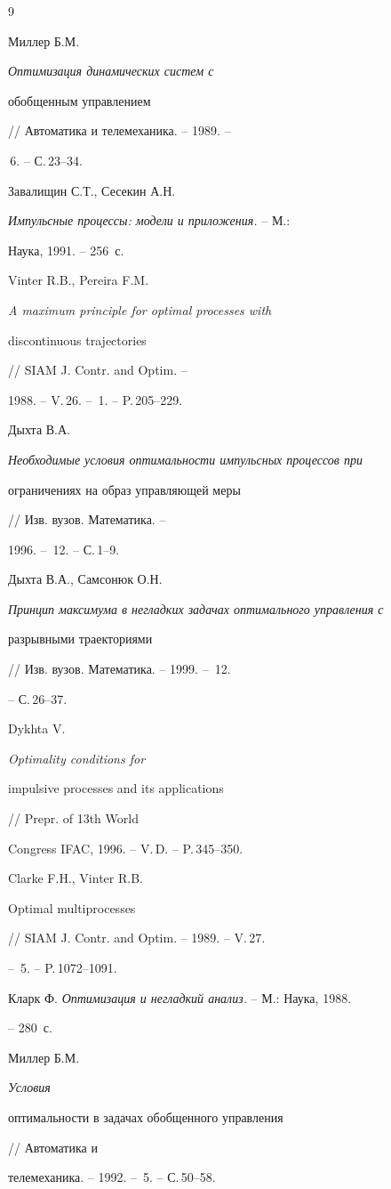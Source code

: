 \begin{thebibliography}{9}




Миллер Б.М. {\it Оптимизация динамических систем с


обобщенным управлением} // Автоматика и телемеханика. -- 1989. --


\No\,6. -- С.\,23--34.




Завалищин С.Т., Сесекин А.Н.


{\it Импульсные процессы: модели и приложения.} -- М.:


Наука, 1991. -- 256~с.




Vinter R.B., Pereira F.M.


{\it A maximum principle for optimal processes with


discontinuous trajectories} // SIAM J. Contr. and Optim. --


1988. -- V.\,26. -- \No\,1. -- P.\,205--229.




Дыхта В.А.


{\it Необходимые условия оптимальности импульсных процессов при


ограничениях на образ управляющей меры} // Изв. вузов. Математика. --


1996. -- \No\,12. -- С.\,1--9.




Дыхта В.А., Самсонюк О.Н.


{\it Принцип максимума в негладких задачах оптимального управления с


разрывными траекториями} // Изв. вузов. Математика. -- 1999. -- \No\,12.


-- С.\,26--37.


 { Dykhta V. } {\it Optimality conditions for


impulsive processes and its applications} // Prepr. of 13th World


Congress IFAC, 1996. -- V.\,D. -- P.\,345--350.




Clarke F.H., Vinter R.B. {\it


Optimal multiprocesses} // SIAM J. Contr. and Optim. -- 1989. -- V.\,27.


-- \No\,5. -- P.\,1072--1091.




Кларк Ф. {\it Оптимизация и негладкий анализ.} -- М.: Наука, 1988.


-- 280~с.




Миллер Б.М. {\it Условия


оптимальности в задачах обобщенного управления} // Автоматика и


телемеханика. -- 1992. -- \No\,5. -- С.\,50--58.





\end{thebibliography}





